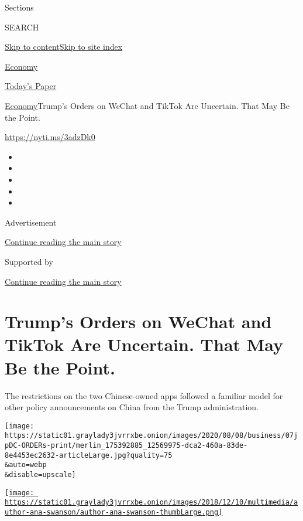 Sections

SEARCH

\protect\hyperlink{site-content}{Skip to
content}\protect\hyperlink{site-index}{Skip to site index}

\href{https://www.nytimes3xbfgragh.onion/section/business/economy}{Economy}

\href{https://myaccount.nytimes3xbfgragh.onion/auth/login?response_type=cookie\&client_id=vi}{}

\href{https://www.nytimes3xbfgragh.onion/section/todayspaper}{Today's
Paper}

\href{/section/business/economy}{Economy}\textbar{}Trump's Orders on
WeChat and TikTok Are Uncertain. That May Be the Point.

\url{https://nyti.ms/3adzDk0}

\begin{itemize}
\item
\item
\item
\item
\item
\end{itemize}

Advertisement

\protect\hyperlink{after-top}{Continue reading the main story}

Supported by

\protect\hyperlink{after-sponsor}{Continue reading the main story}

\hypertarget{trumps-orders-on-wechat-and-tiktok-are-uncertain-that-may-be-the-point}{%
\section{Trump's Orders on WeChat and TikTok Are Uncertain. That May Be
the
Point.}\label{trumps-orders-on-wechat-and-tiktok-are-uncertain-that-may-be-the-point}}

The restrictions on the two Chinese-owned apps followed a familiar model
for other policy announcements on China from the Trump administration.

\texttt{[image: https://static01.graylady3jvrrxbe.onion/images/2020/08/08/business/07jpDC-ORDERs-print/merlin\_175392885\_12569975-dca2-460a-83de-8e4453ec2632-articleLarge.jpg?quality=75\\\&auto=webp\\\&disable=upscale]}

\href{https://www.nytimes3xbfgragh.onion/by/ana-swanson}{\texttt{[image: https://static01.graylady3jvrrxbe.onion/images/2018/12/10/multimedia/author-ana-swanson/author-ana-swanson-thumbLarge.png]}}

